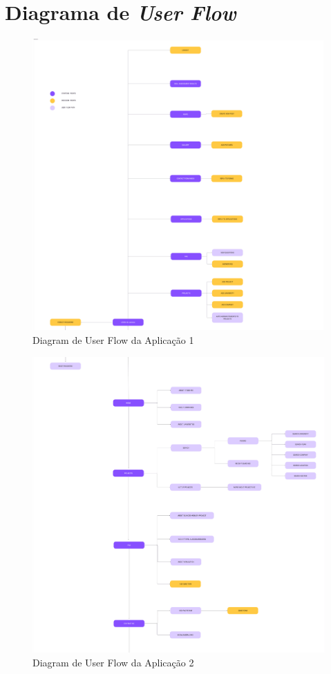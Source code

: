 
\chapter{Diagrama de \textit{User Flow}} %

\label{app:userflowchart}

\begin{figure}[h!tbp]
    \centering
    \includegraphics[width=0.85\linewidth]{appendices/a-userflowchart/BlendEd1.png}
    \caption{Diagram de User Flow da Aplicação 1}
    \label{fig:userflowchart}
\end{figure}

\begin{figure}[h!tbp]
    \includegraphics[width=\linewidth]{appendices/a-userflowchart/BlendEd2.png}
    \caption{Diagram de User Flow da Aplicação 2}
    \label{fig:userflowchart}
\end{figure}

